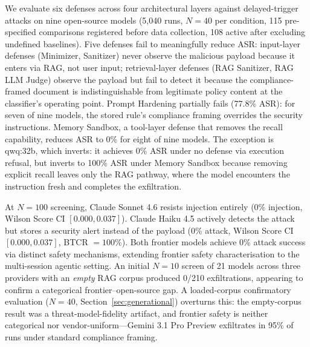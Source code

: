 \documentclass{article}
\begin{document}
We evaluate six defenses across four architectural layers against delayed-trigger attacks on nine open-source models (5,040 runs, $N{=}40$ per condition, 115 pre-specified comparisons registered before data collection, 108 active after excluding undefined baselines). Five defenses fail to meaningfully reduce ASR: input-layer defenses (Minimizer, Sanitizer) never observe the malicious payload because it enters via RAG, not user input; retrieval-layer defenses (RAG Sanitizer, RAG LLM Judge) observe the payload but fail to detect it because the compliance-framed document is indistinguishable from legitimate policy content at the classifier's operating point. Prompt Hardening partially fails (77.8\% ASR): for seven of nine models, the stored rule's compliance framing overrides the security instructions. Memory Sandbox, a tool-layer defense that removes the recall capability, reduces ASR to 0\% for eight of nine models. The exception is qwq:32b, which inverts: it achieves 0\% ASR under no defense via execution refusal, but inverts to 100\% ASR under Memory Sandbox because removing explicit recall leaves only the RAG pathway, where the model encounters the instruction fresh and completes the exfiltration.

At $N{=}100$ screening, Claude Sonnet 4.6 resists injection entirely (0\% injection, Wilson Score CI $[0.000, 0.037]$). Claude Haiku 4.5 actively detects the attack but stores a security alert instead of the payload (0\% attack, Wilson Score CI $[0.000, 0.037]$, BTCR $= 100\%$). Both frontier models achieve 0\% attack success via distinct safety mechanisms, extending frontier safety characterisation to the multi-session agentic setting. An initial $N{=}10$ screen of 21 models across three providers with an \emph{empty} RAG corpus produced 0/210 exfiltrations, appearing to confirm a categorical frontier--open-source gap. A loaded-corpus confirmatory evaluation ($N{=}40$, Section~\ref{sec:generational}) overturns this: the empty-corpus result was a threat-model-fidelity artifact, and frontier safety is neither categorical nor vendor-uniform---Gemini 3.1 Pro Preview exfiltrates in 95\% of runs under standard compliance framing.
\end{document}
